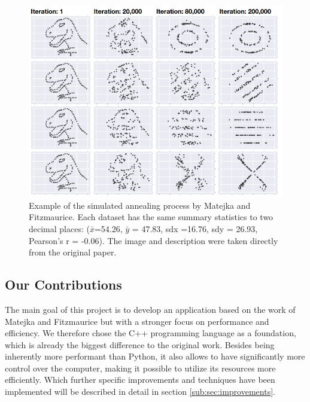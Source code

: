 \documentclass[sigconf]{acmart}
\begin{document}
\begin{figure}[htbp]
  \centering
  \includegraphics[width=\linewidth]{./graphics/Autodesk_Example.PNG}
  \caption{Example of the simulated annealing process by Matejka and Fitzmaurice. Each dataset has the same summary statistics to two decimal places:
  (\(\bar{x}\)=54.26, \(\bar{y}\) = 47.83, sdx =16.76, sdy = 26.93, Pearson’s r = -0.06). The image and description were taken directly from the original paper\cite{10.1145/3025453.3025912}.}
  \label{fig:integer:Autodesk_Example}
\end{figure}
\newpage

\subsection{Our Contributions}
The main goal of this project is to develop an application based on the work of Matejka and Fitzmaurice but with a stronger focus on performance and efficiency. We therefore chose the C++ programming language as a foundation, which is already the biggest difference to the original work.\newline
Besides being inherently more performant than Python, it also allows to have significantly more control over the computer, making it possible to utilize its resources more efficiently. Which further specific improvements and techniques have been implemented will be described in detail in section \ref{sub:sec:improvements}.
\end{document}
